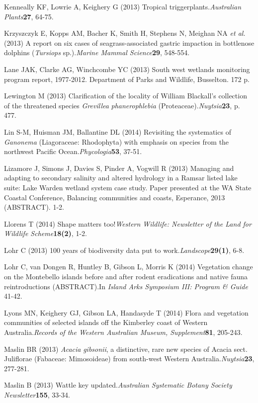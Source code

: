 \documentclass[version=last, paper=a4, DIV=18, usenames, dvipsnames]{scrartcl}
\begin{document}
Kenneally KF, Lowrie A, Keighery G (2013) Tropical triggerplants.\emph{Australian Plants}\textbf{27}, 64-75.


Krzyszczyk E, Kopps AM, Bacher K, Smith H, Stephens N, Meighan NA \emph{et al.} (2013) A report on six cases of seagrass-associated gastric impaction in bottlenose dolphins (\emph{Tursiops} sp.).\emph{Marine Mammal Science}\textbf{29}, 548-554.


Lane JAK, Clarke AG, Winchcombe YC (2013) South west wetlands monitoring program report, 1977-2012. Department of Parks and Wildlife, Busselton. 172 p.


Lewington M (2013) Clarification of the locality of William Blackall's collection of the threatened species \emph{Grevillea} \emph{phanerophlebia} (Proteaceae).\emph{Nuytsia}\textbf{23}, p. 477.


Lin S-M, Huisman JM, Ballantine DL (2014) Revisiting the systematics of \emph{Ganonema} (Liagoraceae: Rhodophyta) with emphasis on species from the northwest Pacific Ocean.\emph{Phycologia}\textbf{53}, 37-51.


Lizamore J, Simons J, Davies S, Pinder A, Vogwill R (2013) Managing and adapting to secondary salinity and altered hydrology in a Ramsar listed lake suite: Lake Warden wetland system case study. Paper presented at the WA State Coastal Conference, Balancing communities and coasts, Esperance, 2013 (ABSTRACT). 1-2.


Llorens T (2014) Shape matters too!\emph{Western Wildlife: Newsletter of the Land for Wildlife Scheme}\textbf{18(2)}, 1-2.


Lohr C (2013) 100 years of biodiversity data put to work.\emph{Landscope}\textbf{29(1)}, 6-8.


Lohr C, van Dongen R, Huntley B, Gibson L, Morris K (2014) Vegetation change on the Montebello islands before and after rodent eradications and native fauna reintroductions (ABSTRACT).In \emph{Island Arks Symposium III: Program \& Guide} 41-42.


Lyons MN, Keighery GJ, Gibson LA, Handasyde T (2014) Flora and vegetation communities of selected islands off the Kimberley coast of Western Australia.\emph{Records of the Western Australian Museum, Supplement}\textbf{81}, 205-243.


Maslin BR (2013) \emph{Acacia} \emph{gibsonii}, a distinctive, rare new species of Acacia sect. Juliflorae (Fabaceae: Mimosoideae) from south-west Western Australia.\emph{Nuytsia}\textbf{23}, 277-281.


Maslin B (2013) Wattle key updated.\emph{Australian Systematic Botany Society Newsletter}\textbf{155}, 33-34.
\end{document}
